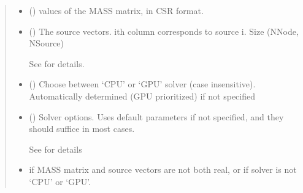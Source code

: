 \documentclass[letterpaper,10pt,english]{sphinxmanual}
\begin{document}
\begin{fulllineitems}
\begin{quote}
\begin{description}
\begin{itemize}
\item {} 
\sphinxAtStartPar
{} () \textendash{} values of the MASS matrix, in CSR format.

\item {} 
\sphinxAtStartPar
{} () \textendash{} 
\sphinxAtStartPar
The source vectors. i\sphinxhyphen{}th column corresponds to source i. Size (NNode, NSource)

\sphinxAtStartPar
See {\hyperref[\detokenize{_autosummary/nirfasterff.math.gen_sources:nirfasterff.math.gen_sources}]{}} for details.


\item {} 
\sphinxAtStartPar
{} (\sphinxstyleliteralemphasis{\sphinxupquote{, }}) \textendash{} Choose between ‘CPU’ or ‘GPU’ solver (case insensitive). Automatically determined (GPU prioritized) if not specified

\item {} 
\sphinxAtStartPar
{} ({\hyperref[\detokenize{_autosummary/nirfasterff.utils.SolverOptions:nirfasterff.utils.SolverOptions}]{}}\sphinxstyleliteralemphasis{\sphinxupquote{, }}) \textendash{} 
\sphinxAtStartPar
Solver options. Uses default parameters if not specified, and they should suffice in most cases.

\sphinxAtStartPar
See {\hyperref[\detokenize{_autosummary/nirfasterff.utils.SolverOptions:nirfasterff.utils.SolverOptions}]{}} for details


\end{itemize}

\begin{itemize}
\item {} 
\sphinxAtStartPar
{} \textendash{} if MASS matrix and source vectors are not both real, or if solver is not ‘CPU’ or ‘GPU’.


\end{itemize}
\end{description}
\end{quote}
\end{fulllineitems}
\end{document}
